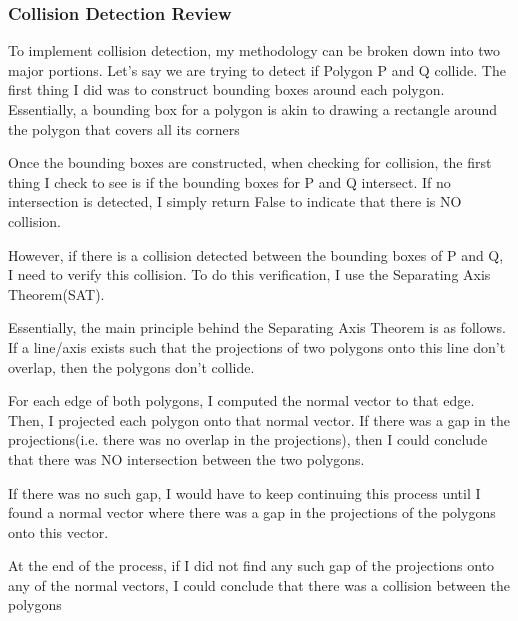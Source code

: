 \documentclass{article}
\begin{document}
\subsubsection{Collision Detection Review}
To implement collision detection, my methodology can be broken down into two major portions. Let's say we are trying to detect if Polygon P and Q collide. The first thing I did was to construct bounding boxes around each polygon. Essentially, a bounding box for a polygon is akin to drawing a rectangle around the polygon that covers all its corners \newline 

Once the bounding boxes are constructed, when checking for collision, the first thing I check to see is if the bounding boxes for P and Q intersect. If no intersection is detected, I simply return False to indicate that there is NO collision. \newline 

However, if there is a collision detected between the bounding boxes of P and Q, I need to verify this collision. To do this verification, I use the Separating Axis Theorem(SAT). \newline 

Essentially, the main principle behind the Separating Axis Theorem is as follows. If a line/axis exists such that the projections of two polygons onto this line don't overlap, then the polygons don't collide. \newline 

For each edge of both polygons, I computed the normal vector to that edge. Then, I projected each polygon onto that normal vector. If there was a gap in the projections(i.e. there was no overlap in the projections), then I could conclude that there was NO intersection between the two polygons. 

If there was no such gap, I would have to keep continuing this process until I found a normal vector where there was a gap in the projections of the polygons onto this vector. 

At the end of the process, if I did not find any such gap of the projections onto any of the normal vectors, I could conclude that there was a collision between the polygons 

\newpage 
\end{document}
